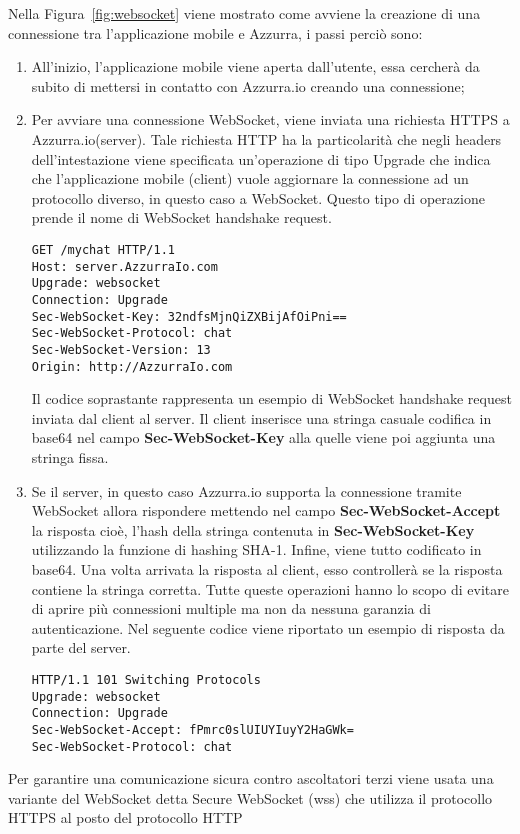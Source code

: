 Nella Figura~\ref{fig:websocket} viene mostrato come avviene la creazione di una connessione tra l'applicazione mobile e Azzurra, i passi perciò sono:
\begin{enumerate}
	\item All'inizio, l'applicazione mobile viene aperta dall'utente, essa cercherà da subito di mettersi in contatto con Azzurra.io creando una connessione;
	\item Per avviare una connessione WebSocket, viene inviata una richiesta HTTPS a Azzurra.io(server). Tale richiesta HTTP ha la particolarità che negli headers dell’intestazione viene specificata un'operazione di tipo Upgrade che indica che l'applicazione mobile (client) vuole aggiornare la connessione ad un protocollo diverso, in questo caso a WebSocket. Questo tipo di operazione prende il nome di WebSocket handshake request.\\
	\begin{lstlisting}
GET /mychat HTTP/1.1
Host: server.AzzurraIo.com
Upgrade: websocket	
Connection: Upgrade		
Sec-WebSocket-Key: 32ndfsMjnQiZXBijAfOiPni==
Sec-WebSocket-Protocol: chat		
Sec-WebSocket-Version: 13		
Origin: http://AzzurraIo.com
	\end{lstlisting}
	Il codice soprastante rappresenta un esempio di WebSocket handshake request inviata dal client al server. Il client inserisce una stringa casuale codifica in base64 nel campo \textbf{Sec-WebSocket-Key} alla quelle viene poi aggiunta una stringa fissa.
	\item Se il server, in questo caso Azzurra.io supporta la connessione tramite WebSocket allora rispondere mettendo nel campo \textbf{Sec-WebSocket-Accept} la risposta cioè, l'hash della stringa contenuta in \textbf{Sec-WebSocket-Key} utilizzando la funzione di hashing SHA-1. Infine, viene tutto codificato in base64. Una volta arrivata la risposta al client, esso controllerà se la risposta contiene la stringa corretta. Tutte queste operazioni hanno lo scopo di evitare di aprire più connessioni multiple ma non da nessuna garanzia di autenticazione.
	Nel seguente codice viene riportato un esempio di risposta da parte del server.\\
	\begin{lstlisting}
HTTP/1.1 101 Switching Protocols
Upgrade: websocket
Connection: Upgrade
Sec-WebSocket-Accept: fPmrc0slUIUYIuyY2HaGWk=
Sec-WebSocket-Protocol: chat
	\end{lstlisting}
\end{enumerate}
Per garantire una comunicazione sicura contro ascoltatori terzi viene usata una variante del WebSocket detta Secure WebSocket (wss) che utilizza il protocollo HTTPS al posto del protocollo HTTP
